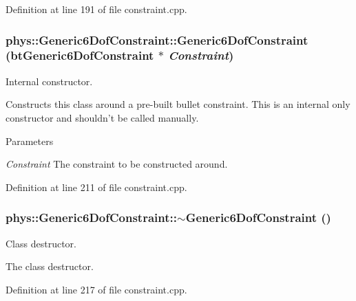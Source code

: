 Definition at line 191 of file constraint.cpp.

\hypertarget{classphys_1_1Generic6DofConstraint_a7e44417fc8f56eb1770990fa3c3273d3}{
\subsubsection[{Generic6DofConstraint}]{\setlength{\rightskip}{0pt plus 5cm}phys::Generic6DofConstraint::Generic6DofConstraint (btGeneric6DofConstraint $\ast$ {\em Constraint})}}
\label{de/d2a/classphys_1_1Generic6DofConstraint_a7e44417fc8f56eb1770990fa3c3273d3}


Internal constructor. 

Constructs this class around a pre-\/built bullet constraint. This is an internal only constructor and shouldn't be called manually. 
\begin{DoxyParams}{Parameters}
\item[{\em Constraint}]The constraint to be constructed around. \end{DoxyParams}


Definition at line 211 of file constraint.cpp.

\hypertarget{classphys_1_1Generic6DofConstraint_a0b0bd2e1f1546ed1e6b2ebc2a505a126}{
\subsubsection[{$\sim$Generic6DofConstraint}]{\setlength{\rightskip}{0pt plus 5cm}phys::Generic6DofConstraint::$\sim$Generic6DofConstraint ()}}
\label{de/d2a/classphys_1_1Generic6DofConstraint_a0b0bd2e1f1546ed1e6b2ebc2a505a126}


Class destructor. 

The class destructor. 

Definition at line 217 of file constraint.cpp.



